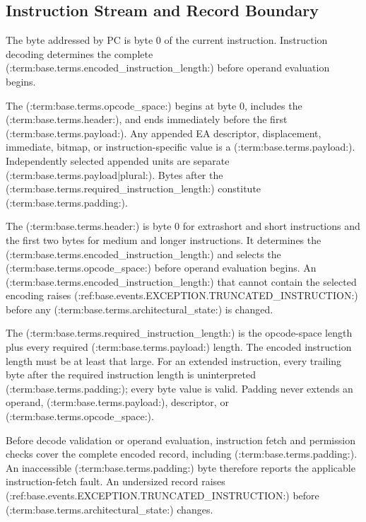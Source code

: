 \subsection{Instruction Stream and Record Boundary}
The byte addressed by PC is byte 0 of the current instruction. Instruction decoding determines the complete
(:term:base.terms.encoded_instruction_length:) before operand evaluation begins.

The (:term:base.terms.opcode_space:) begins at byte 0, includes the (:term:base.terms.header:), and ends immediately before the first (:term:base.terms.payload:). Any appended
EA descriptor, displacement, immediate, bitmap, or instruction-specific value is a (:term:base.terms.payload:). Independently selected
appended units are separate (:term:base.terms.payload|plural:). Bytes after the (:term:base.terms.required_instruction_length:) constitute (:term:base.terms.padding:).

The (:term:base.terms.header:) is byte 0 for extrashort and short instructions and the first two bytes for medium and longer
instructions. It determines the (:term:base.terms.encoded_instruction_length:) and selects the (:term:base.terms.opcode_space:) before operand evaluation
begins. An (:term:base.terms.encoded_instruction_length:) that cannot contain the selected encoding raises
(:ref:base.events.EXCEPTION.TRUNCATED_INSTRUCTION:) before any (:term:base.terms.architectural_state:) is changed.

The (:term:base.terms.required_instruction_length:) is the opcode-space length plus every required (:term:base.terms.payload:) length. The encoded
instruction length must be at least that large. For an extended instruction, every trailing byte after the required
instruction length is uninterpreted (:term:base.terms.padding:); every byte value is valid. Padding never extends an operand, (:term:base.terms.payload:),
descriptor, or (:term:base.terms.opcode_space:).

Before decode validation or operand evaluation, instruction fetch and permission checks cover the complete encoded
record, including (:term:base.terms.padding:). An inaccessible (:term:base.terms.padding:) byte therefore reports the applicable instruction-fetch fault.
An undersized record raises (:ref:base.events.EXCEPTION.TRUNCATED_INSTRUCTION:) before (:term:base.terms.architectural_state:) changes.
